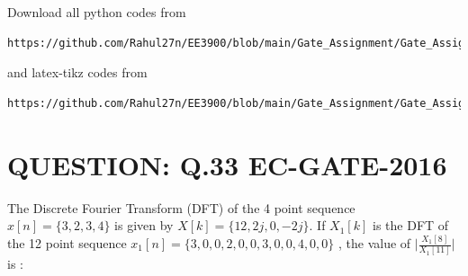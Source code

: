 \documentclass[journal,12pt,twocolumn]{IEEEtran}
\begin{document}
Download all python codes from 
\begin{lstlisting}
https://github.com/Rahul27n/EE3900/blob/main/Gate_Assignment/Gate_Assignment.py
\end{lstlisting}
%
and latex-tikz codes from 
%
\begin{lstlisting}
https://github.com/Rahul27n/EE3900/blob/main/Gate_Assignment/Gate_Assignment.tex
\end{lstlisting}

\vspace{0.5cm}
\section{QUESTION: Q.33 EC-GATE-2016}

The Discrete Fourier Transform (DFT) of the 4 point sequence $ x[n] =\{3, 2, 3, 4\}$ is given by $ X[k] =\{12, 2j, 0, -2j\}$. If $X_{1}[k]$ is the DFT of the 12 point sequence $ x_{1}[n] =\{3, 0, 0, 2, 0, 0, 3, 0, 0, 4, 0, 0\}$ , the value of $\big|{\frac{X_{1}[8]}{X_{1}[11]}}\big|$ is :
\end{document}
